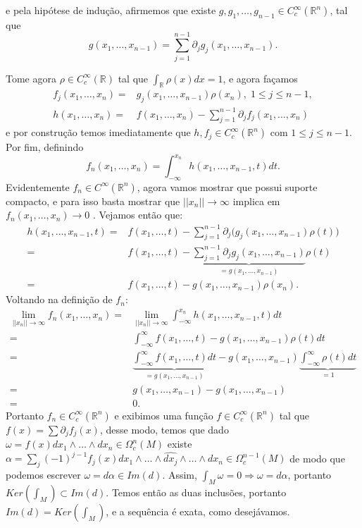 \documentclass{article}
\begin{document}
	e pela hipótese de indução, afirmemos que existe $g, g_{1}, \dots, g_{n-1} \in C^{\infty}_{c}(\mathbb{R}^{n})$, tal que
	$$
	g(x_{1}, \dots, x_{n-1}) = \sum_{j=1}^{n-1} \partial_{j}g_{j}(x_{1}, \dots, x_{n-1}).
	$$
	
	Tome agora $\rho \in C^{\infty}_{c}(\mathbb{R})$ tal que $\int_{\mathbb{R}} \rho(x)dx = 1$, e agora façamos 
	$$
	\begin{aligned}
	f_{j}(x_{1}, \dots, x_{n}) =& g_{j}(x_{1}, \dots, x_{n-1})\rho(x_{n}), \; 1 \leq j \leq n-1,
	\\
	h(x_{1}, \dots, x_{n}) =& f(x_{1}, \dots, x_{n}) - \sum_{j=1}^{n-1} \partial_{j}f_{j}(x_{1}, \dots, x_{n})
	\end{aligned}
	$$
	e por construção temos imediatamente que $h, f_{j} \in C^{\infty}_{c}(\mathbb{R}^{n})$ com $1 \leq j \leq n-1$. Por fim, definindo
	$$
	f_{n}(x_{1}, \dots, x_{n}) = \int_{-\infty}^{x_{n}}h(x_{1}, \dots, x_{n-1}, t)dt.
	$$
	Evidentemente $f_{n} \in C^{\infty}(\mathbb{R}^{n})$, agora vamos mostrar que possui suporte compacto, e para isso basta mostrar que $||x_{n}|| \to \infty$ implica em $f_{n}(x_{1}, \dots, x_{n}) \to 0$ . Vejamos então que:
	$$
	\begin{aligned}
	h(x_{1}, \dots, x_{n-1}, t) =& f(x_{1}, \dots, t) - \sum_{j=1}^{n-1} \partial_{j} \Big(g_{j}(x_{1}, \dots, x_{n-1})\rho(t) \Big)
	\\
	=& f(x_{1}, \dots, t) - \underbrace{ \sum_{j=1}^{n-1} \partial_{j} g_{j}(x_{1}, \dots, x_{n-1}) }_{ =g(x_{1}, \dots, x_{n-1})}\rho(t)
	\\
	=& f(x_{1}, \dots, t) - g(x_{1}, \dots, x_{n-1})\rho(x_{n}).
	\end{aligned}
	$$
	Voltando na definição de $f_{n}$:
	$$
	\begin{aligned}
	\lim_{||x_{n}|| \to \infty} f_{n}(x_{1}, \dots, x_{n}) 
	=& \lim_{||x_{n}|| \to \infty} \int_{-\infty}^{x_{n}}h(x_{1}, \dots, x_{n-1}, t)dt
	\\
	=& \int_{-\infty}^{\infty}f(x_{1}, \dots, t) - g(x_{1}, \dots, x_{n-1})\rho(t)dt
	\\
	=& \underbrace{ \int_{-\infty}^{\infty}f(x_{1}, \dots, t)dt }_{= g(x_{1}, \dots, x_{n-1})} - g(x_{1}, \dots, x_{n-1}) \underbrace{ \int_{-\infty}^{\infty}\rho(t)dt }_{=1}
	\\
	=& g(x_{1}, \dots, x_{n-1}) - g(x_{1}, \dots, x_{n-1})
	\\
	=&0.
	\end{aligned}
	$$	
	Portanto $f_{n} \in C_{c}^{\infty}(\mathbb{R}^{n})$ e exibimos uma função $f \in C_{c}^{\infty}(\mathbb{R}^{n})$ tal que $f(x) = \sum \partial_{j}f_{j}(x)$, desse modo, temos que dado $\omega = f(x) dx_{1} \wedge \dots \wedge dx_{n} \in \Omega_{c}^{n}(M)$ existe $\alpha = \sum_{j} (-1)^{j-1}f_{j}(x) dx_{1} \wedge \dots \wedge \hat{dx_{j}} \wedge \dots \wedge dx_{n} \in \Omega_{c}^{n-1}(M)$ de modo que podemos escrever $\omega = d\alpha \in Im(d)$. Assim, $\int_{M} \omega = 0 \Rightarrow \omega = d\alpha$, portanto $Ker(\int_{M}) \subset Im(d)$. Temos então as duas inclusões, portanto $Im(d) = Ker(\int_{M})$, e a sequência é exata, como desejávamos. 
	
\end{document}
